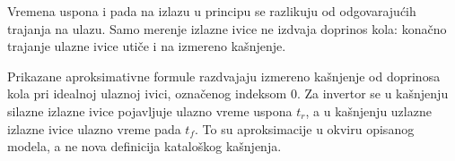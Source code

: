 Vremena uspona i pada na izlazu u principu se razlikuju od odgovarajućih trajanja na ulazu. Samo merenje izlazne ivice ne izdvaja doprinos kola: konačno trajanje ulazne ivice utiče i na izmereno kašnjenje.

Prikazane aproksimativne formule razdvajaju izmereno kašnjenje od doprinosa kola pri idealnoj ulaznoj ivici, označenog indeksom 0. Za invertor se u kašnjenju silazne izlazne ivice pojavljuje ulazno vreme uspona $t_r$, a u kašnjenju uzlazne izlazne ivice ulazno vreme pada $t_f$. To su aproksimacije u okviru opisanog modela, a ne nova definicija kataloškog kašnjenja.
